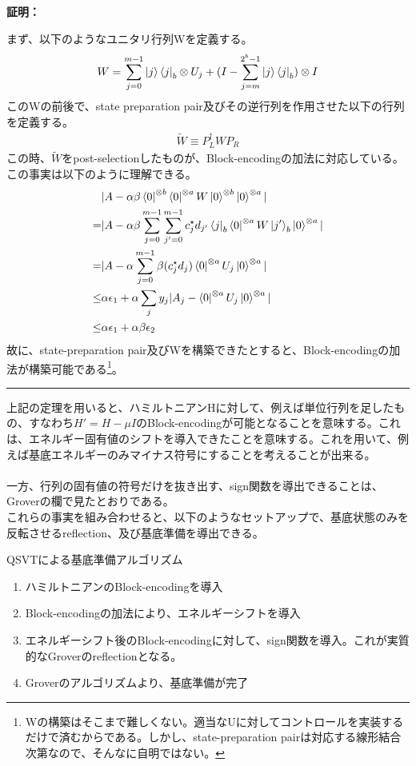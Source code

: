\documentclass[a4paper,10.5pt]{article}
\numberwithin{equation}{section}
\newenvironment{proofbox}
{\begin{prooflabel}\textbf{証明：}\end{prooflabel}\vspace{0.8em}}
{\par\vspace{1em}\hrule\vspace{1em}}
\begin{document}
\begin{proofbox}
    まず、以下のようなユニタリ行列Wを定義する。
    \begin{align*}
        W=\sum_{j=0}^{m-1}\ket{j}\bra{j}_{b}\otimes U_{j}+(I-\sum_{j=m}^{2^{b}-1}\ket{j}\bra{j}_{b})\otimes I
    \end{align*}
    このWの前後で、state preparation pair及びその逆行列を作用させた以下の行列を定義する。
    \begin{align*}
        \tilde{W}\equiv P_{L}^{\dagger}WP_{R}
    \end{align*}
    この時、$\tilde{W}$をpost-selectionしたものが、Block-encodingの加法に対応している。この事実は以下のように理解できる。
    \begin{align*}
        &|A-\alpha\beta\bra{0}^{\otimes b}\bra{0}^{\otimes a}W\ket{0}^{\otimes b}\ket{0}^{\otimes a}|\\
        =&|A-\alpha\beta \sum_{j=0}^{m-1}\sum_{j'=0}^{m-1}c_{j}^{\star}d_{j'}\bra{j}_{b}\bra{0}^{\otimes a}W\ket{j'}_{b}\ket{0}^{\otimes a}|\\
        =&|A-\alpha\sum_{j=0}^{m-1}\beta(c_{j}^{\star}d_{j})\bra{0}^{\otimes a}U_{j}\ket{0}^{\otimes a}|\\
        \leq&\alpha\epsilon_{1}+\alpha\sum_{j}y_{j}|A_{j}-\bra{0}^{\otimes a}U_{j}\ket{0}^{\otimes a}|\\
        \leq& \alpha\epsilon_{1}+\alpha\beta\epsilon_{2}
    \end{align*}
    故に、state-preparation pair及びWを構築できたとすると、Block-encodingの加法が構築可能である\footnote{Wの構築はそこまで難しくない。適当なUに対してコントロールを実装するだけで済むからである。しかし、state-preparation pairは対応する線形結合次第なので、そんなに自明ではない。}。
\end{proofbox}
上記の定理を用いると、ハミルトニアンHに対して、例えば単位行列を足したもの、すなわち$H'=H-\mu I$のBlock-encodingが可能となることを意味する。これは、エネルギー固有値のシフトを導入できたことを意味する。これを用いて、例えば基底エネルギーのみマイナス符号にすることを考えることが出来る。\\
\\
一方、行列の固有値の符号だけを抜き出す、sign関数を導出できることは、Groverの欄で見たとおりである。\\
これらの事実を組み合わせると、以下のようなセットアップで、基底状態のみを反転させるreflection、及び基底準備を導出できる。
\begin{setupbox}{QSVTによる基底準備アルゴリズム}
\begin{enumerate}
    \item ハミルトニアンのBlock-encodingを導入
    \item Block-encodingの加法により、エネルギーシフトを導入
    \item エネルギーシフト後のBlock-encodingに対して、sign関数を導入。これが実質的なGroverのreflectionとなる。
    \item Groverのアルゴリズムより、基底準備が完了
\end{enumerate}
\end{setupbox}
\end{document}
